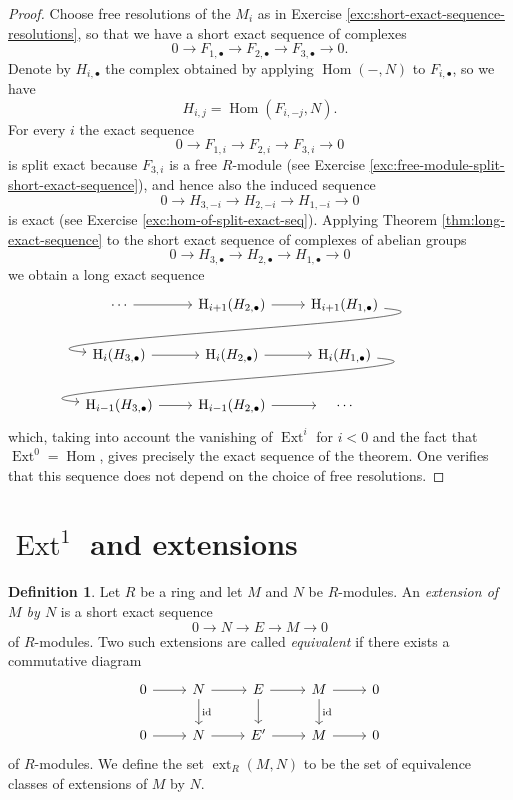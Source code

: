\documentclass[11pt]{amsbook}
\newcommand{\longto}{\longrightarrow}
\DeclareMathOperator\Hom{Hom}
\DeclareMathOperator\Ext{Ext}
\DeclareMathOperator\ext{ext}
\def\rH{{\mathrm H}} \def\rK{{\mathrm K}} \def\rR{{\mathrm R}}
\def\id{{\rm id}}
\theoremstyle{plain}
\theoremstyle{definition}
\newtheorem{definition}[theorem]{Definition}
\begin{document}
\begin{proof}
Choose free resolutions of the $M_i$ as in Exercise \ref{exc:short-exact-sequence-resolutions}, so that we have a short exact sequence of complexes
\[
	 0 \longto F_{1,\bullet} \longto F_{2,\bullet} \longto F_{3,\bullet} \longto 0.
\]
Denote by $H_{i,\bullet}$ the complex obtained by applying $\Hom(-,N)$ to $F_{i,\bullet}$, so we have
\[
	H_{i,j} = \Hom(F_{i,-j}, N).
\]
For every $i$ the exact sequence
\[
	0 \longto F_{1,i} \longto F_{2,i} \longto F_{3,i} \longto 0
\]
is split exact because $F_{3,i}$ is a free $R$-module (see Exercise \ref{exc:free-module-split-short-exact-sequence}), and hence also the induced sequence
\[
	0 \longto H_{3,-i} \longto H_{2,-i} \longto
	H_{1,-i} \longto 0
\]
is exact (see Exercise \ref{exc:hom-of-split-exact-seq}). Applying Theorem \ref{thm:long-exact-sequence}
to the short exact sequence of complexes of abelian groups
\[
	0 \longto H_{3,\bullet} \longto H_{2,\bullet} \longto H_{1,\bullet} \longto 0
\]
 we obtain a long exact sequence
 \[
\mkern-72mu\begin{tikzcd}
		& \cdots \arrow{r}
		& \rH_{i+1}(H_{2,\bullet}) \arrow{r} 
		& \rH_{i+1}(H_{1,\bullet})  \arrow[out=-5, in=175]{dll} \\
	&\rH_{i}(H_{3,\bullet})  \arrow{r}
		& \rH_{i}(H_{2,\bullet}) \arrow{r} 
		& \rH_{i}(H_{1,\bullet})  \arrow[out=-5, in=175]{dll} \\
	& \rH_{i-1}(H_{3,\bullet}) \arrow{r}
		& \rH_{i-1}(H_{2,\bullet}) \arrow{r} 
		& \quad\cdots\quad
\end{tikzcd} 
\]
which, taking into account the vanishing of $\Ext^{i}$ for $i<0$ and the fact that $\Ext^0=\Hom$, gives precisely the 
exact sequence of the theorem. One verifies that this sequence does not depend on the choice of free resolutions.
\end{proof}

\section{$\Ext^1$ and  extensions}





\begin{definition}
Let $R$ be a ring and let $M$ and $N$ be $R$-modules. An \emph{extension of $M$ by $N$} is a short exact sequence
\[
	0 \longto N \longto E \longto M \longto 0
\]
of $R$-modules. Two such extensions are called \emph{equivalent} if there exists a commutative diagram
\[
\begin{tikzcd}
0 \arrow{r} & N \arrow{r} \arrow{d}{\id} & E \arrow{r} \arrow{d} & M \arrow{r} \arrow{d}{\id} & 0 \\
0  \arrow{r} & N \arrow {r} & E' \arrow{r} & M \arrow{r} & 0
\end{tikzcd}
\]
of $R$-modules. We define the set $\ext_R(M,N)$ to be the set of equivalence classes of extensions of $M$ by $N$.
\end{definition}
\end{document}
